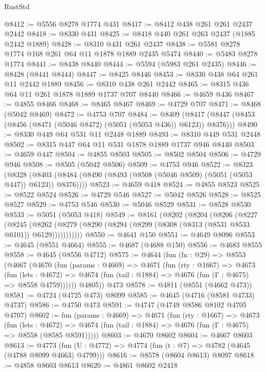 \begin{lexlean}{RustStd}
\begin{coremodule}
@8412 := @5556 @8278 @1774 @431
@8417 := @8412 @438 @261 @261 @2437 @2442
@8418 := @8330 @431
@8425 := @8418 @440 @261 @263 @2437 (@1885 @2442 @1889)
@8428 := @8310 @431 @261 @2437
@8438 := @5581 @8278 @1774 @168 @261 @64 @11 @1878 @1889 @2435 @5474
@8440 := @5483 @8278 @1774
@8441 := @8438 @8440
@8444 := @5594 (@5983 @261 @2435)
@8446 := @8428 (@8441 @8444)
@8447 := @8425 @8446
@8453 := @8330 @438 @64 @261 @11 @2442 @1889
@8456 := @8310 @438 @261 @2442
@8465 := @8315 @436 @64 @11 @261 @1878 @1889 @1737 @707 @8440
@8466 := @4659 @436
@8467 := @4855 @8466
@8468 := @8465 @8467
@8469 := @4729 @707
@8471 := @8468 (@5042 @8469)
@8472 := @4753 @707
@8484 := @8409
    (@8417 (@8447 (@8453 (@8456 (@8471 (@5046 @8472) (@5051 (@5053 @436)) @6123)) @8376)))
@8490 := @8330 @449 @64 @531 @11 @2448 @1889
@8493 := @8310 @449 @531 @2448
@8502 := @8315 @447 @64 @11 @531 @1878 @1889 @1737 @946 @8440
@8503 := @4659 @447
@8504 := @4855 @8503
@8505 := @8502 @8504
@8506 := @4729 @946
@8508 := @8505 (@5042 @8506)
@8509 := @4753 @946
@8522 := @8323
    (@8328 (@8403 (@8484 (@8490 (@8493 (@8508 (@5046 @8509) (@5051 (@5053 @447)) @6123)) @8376))))
@8523 := @4659 @418
@8524 := @4855 @8523
@8525 := @8522 @8524
@8526 := @4729 @546
@8527 := @5042 @8526
@8528 := @8525 @8527
@8529 := @4753 @546
@8530 := @5046 @8529
@8531 := @8528 @8530
@8533 := @5051 (@5053 @418)
@8549 := @8161
    (@8202
      (@8204
        (@8206
          (@8227
            (@8245
              (@8262 (@8279 (@8290 (@8294 (@8299 (@8308 (@8313 (@8531 @8533 @6101)) @6129)))))))))))
@8550 := @4641 @150
@8551 := @4649 @8096
@8553 := @4645 (@8551 @4664)
@8555 := @4687 (@4688 @150)
@8556 := @4683 @8555
@8558 := @4645 (@8556 @4712)
@8575 := @4644
    (fun (fn : @29) =>
    @8553
      (@4667
        (@4670
          (fun (params : @4669) =>
          @4671
            (fun (rty : @1667) =>
            @4673
              (fun (lets : @4672) =>
              @4674 (fun (tail : @1884) => @4676 (fun (Γ : @4675) => @8558 @4759))))))
        @4805))
    @473
@8578 := @4811 (@8551 (@4662 @473))
@8581 := @4724 (@4725 @473) @8099
@8585 := @4645 (@4716 (@8581 @4733) @4737)
@8586 := @4750 @473
@8591 := @4747 (@4749 @8586 @8102 @4705 @4707)
@8602 := fun (params : @4669) =>
  @4671
    (fun (rty : @1667) =>
    @4673
      (fun (lets : @4672) =>
      @4674 (fun (tail : @1884) => @4676 (fun (Γ : @4675) => @8558 (@8585 @8591)))))
@8603 := @4670 @8602
@8604 := @4667 @8603
@8613 := @4773 (fun (U : @4772) => @4774 (fun (t : @7) => @4782 (@4645 (@4788 @8099 @4663) @4799)))
@8616 := @8578 (@8604 @8613) @8097
@8618 := @4858 @8603 @8613
@8620 := @4861 @8602 @2418

\end{coremodule}
\end{lexlean}

